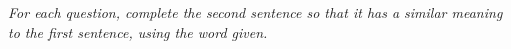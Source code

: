 \documentclass{article}
\begin{document}
\noindent \textit{For each question, complete the second sentence so that it has a similar meaning to the first sentence, using the word given.}

%
%
%
%
%
%
%
%
%
%
%
%
%
%
%
%
%
%
%
%
\end{document}
